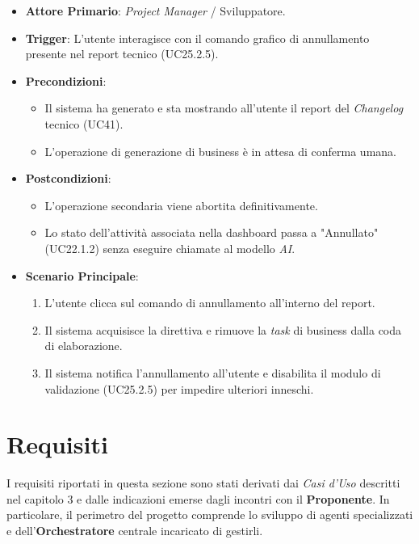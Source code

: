 \documentclass[12pt, a4paper]{article}
\begin{document}
\begin{itemize}
    \item \textbf{Attore Primario}: \textit{Project Manager} / Sviluppatore.
    
    \item \textbf{Trigger}: L'utente interagisce con il comando grafico di annullamento presente nel report tecnico (UC25.2.5).
    
    \item \textbf{Precondizioni}:
    \begin{itemize}
        \item Il sistema ha generato e sta mostrando all'utente il report del \textit{Changelog} tecnico (UC41).
        \item L'operazione di generazione di business è in attesa di conferma umana.
    \end{itemize}
    
    \item \textbf{Postcondizioni}:
    \begin{itemize}
        \item L'operazione secondaria viene abortita definitivamente.
        \item Lo stato dell'attività associata nella dashboard passa a "Annullato" (UC22.1.2) senza eseguire chiamate al modello \textit{AI}.
    \end{itemize}
    
    \item \textbf{Scenario Principale}:
    \begin{enumerate}
        \item L'utente clicca sul comando di annullamento all'interno del report.
        \item Il sistema acquisisce la direttiva e rimuove la \textit{task} di business dalla coda di elaborazione.
        \item Il sistema notifica l'annullamento all'utente e disabilita il modulo di validazione (UC25.2.5) per impedire ulteriori inneschi.
    \end{enumerate}
\end{itemize}


\newpage

\section{Requisiti}

I requisiti riportati in questa sezione sono stati derivati dai \textit{Casi d'Uso} descritti nel capitolo 3 e dalle indicazioni emerse dagli incontri con il \textbf{Proponente}. In particolare, il perimetro del progetto comprende lo sviluppo di agenti specializzati e dell'\textbf{Orchestratore} centrale incaricato di gestirli.
\end{document}
